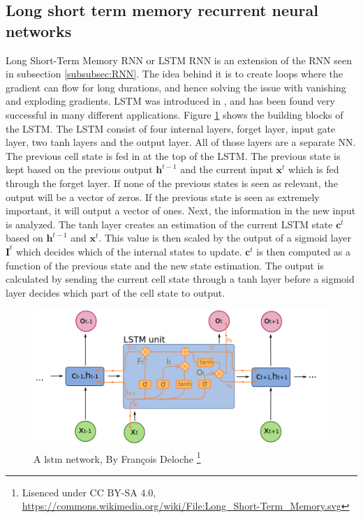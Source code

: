     \subsection{Long short term memory recurrent neural networks}
        Long Short-Term Memory RNN or LSTM RNN is an extension of the RNN seen in subsection \ref{subsubsec:RNN}. The idea behind it is to create loops where the gradient can flow for long durations, and hence solving the issue with vanishing and exploding gradients. LSTM was introduced in \cite{Hochreiter1997}, and has been found very successful in many different applications. Figure  \ref{fig:lstm} shows the building blocks of the LSTM. The LSTM consist of four internal layers, forget layer, input gate layer, two tanh layers and the output layer. All of those layers are a separate NN. The previous cell state is fed in at the top of the LSTM. The previous state is kept based on the previous output $\bm h^{t-1}$ and the current input $\bm x^t$ which is fed through the forget layer. If none of the previous states is seen as relevant, the output will be a vector of zeros. If the previous state is seen as extremely important, it will output a vector of ones. Next, the information in the new input is analyzed. The tanh layer creates an estimation of the current LSTM state $\bm c^t$ based on $\bm h^{t-1}$ and $\bm x^t$. This value is then scaled by the output of a sigmoid layer $\bm I^t$ which decides which of the internal states to update. $\bm c^t$ is then computed as a function of the previous state and the new state estimation. The output is calculated by sending the current cell state through a tanh layer before a sigmoid layer decides which part of the cell state to output.  
        
        \begin{figure}
            \begin{minipage}[b]{0.99\linewidth}
            \centering
            \includegraphics[width = \textwidth]{report/figures/techniques/lstm.png}
            \caption{A lstm network, By François Deloche \footnote{Lisenced under CC BY-SA 4.0, \url{https://commons.wikimedia.org/wiki/File:Long_Short-Term_Memory.svg}}} 
            \label{fig:lstm}
            \end{minipage}
        \end{figure}
        
